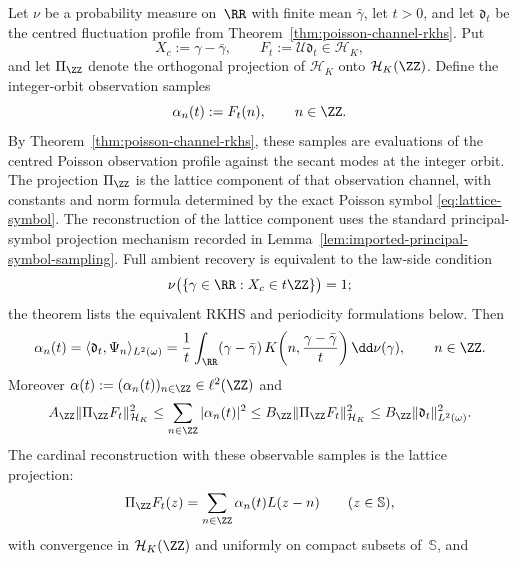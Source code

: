 \begin{theorem}%
\label{thm:poisson-observation-lattice-sampling}
\label{prop:poisson-law-lattice-periodicity}
Let $\nu$ be a probability measure on~$\RR$ with finite mean
$\bar{\gamma}$, let $t>0$, and let $\mathfrak d_t$ be the centred
fluctuation profile from Theorem~\ref{thm:poisson-channel-rkhs}.  Put
\[
  X_c:=\gamma-\bar{\gamma},
  \qquad
F_t:=\mathcal U\mathfrak d_t\in\mathcal H_K,
\]
and let $\Pi_{\ZZ}$ denote the orthogonal projection of $\mathcal H_K$ onto
$\mathcal H_K(\ZZ)$.  Define the integer-orbit observation samples
\[
\alpha_n(t):=F_t(n),\qquad n\in\ZZ .
\]
By Theorem~\ref{thm:poisson-channel-rkhs}, these samples are evaluations of
the centred Poisson observation profile against the secant modes at the
integer orbit.  The projection $\Pi_{\ZZ}$ is the lattice component of that
observation channel, with constants and norm formula determined by the exact
Poisson symbol \eqref{eq:lattice-symbol}.  The reconstruction of the lattice
component uses the standard principal-symbol projection mechanism recorded in
Lemma~\ref{lem:imported-principal-symbol-sampling}.  Full ambient recovery is
equivalent to the law-side condition
\[
\nu\bigl(\{\gamma\in\RR:X_c\in t\ZZ\}\bigr)=1;
\]
the theorem lists the equivalent RKHS and periodicity formulations below.
Then
\begin{equation}\label{eq:poisson-observation-integer-samples}
\alpha_n(t)
=\langle \mathfrak d_t,\Psi_n\rangle_{L^2(\omega)}
=\frac1t\int_{\RR}
(\gamma-\bar{\gamma})\,
K\!\left(n,\frac{\gamma-\bar{\gamma}}{t}\right)\dd\nu(\gamma),
\qquad n\in\ZZ .
\end{equation}
Moreover $\alpha(t):=(\alpha_n(t))_{n\in\ZZ}\in\ell^2(\ZZ)$ and
\begin{equation}\label{eq:poisson-observation-lattice-stability}
A_{\ZZ}\|\Pi_{\ZZ}F_t\|_{\mathcal H_K}^2
\le
\sum_{n\in\ZZ}|\alpha_n(t)|^2
\le
B_{\ZZ}\|\Pi_{\ZZ}F_t\|_{\mathcal H_K}^2
\le
B_{\ZZ}\|\mathfrak d_t\|_{L^2(\omega)}^2.
\end{equation}
The cardinal reconstruction with these observable samples is the lattice
projection:
\begin{equation}\label{eq:poisson-observation-cardinal-projection}
\Pi_{\ZZ}F_t(z)
=\sum_{n\in\ZZ}\alpha_n(t)L(z-n)
\qquad(z\in\mathbb S),
\end{equation}
with convergence in $\mathcal H_K(\ZZ)$ and uniformly on compact subsets
of~$\mathbb S$, and
\begin{equation}\label{eq:poisson-observation-cardinal-norm}

\end{equation}
\end{theorem}
